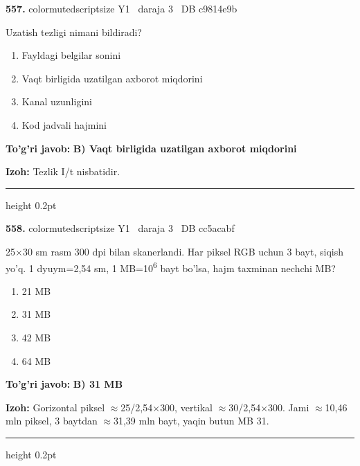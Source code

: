 \documentclass[10pt,a4paper,oneside]{article}
\begin{document}
\noindent\textbf{\color{ink}557.}  {color{muted}scriptsize Y1 \textbullet\ daraja 3 \textbullet\ DB c9814e9b}
\par
Uzatish tezligi nimani bildiradi?
\begin{enumerate}[label=\Alph*),leftmargin=9mm]
\item Fayldagi belgilar sonini
\item Vaqt birligida uzatilgan axborot miqdorini
\item Kanal uzunligini
\item Kod jadvali hajmini
\end{enumerate}
\begin{tcolorbox}[enhanced,breakable,colback=teal!4,colframe=teal!50!black,boxrule=0.5pt,arc=1.1mm,left=3mm,right=3mm,top=1.7mm,bottom=1.7mm,before skip=2mm,after skip=2mm]
\textbf{\color{teal}To'g'ri javob:} \textbf{B) Vaqt birligida uzatilgan axborot miqdorini}
\par\smallskip
\textbf{Izoh:} Tezlik I/t nisbatidir.
\end{tcolorbox}
\vspace{2mm}\hrule height 0.2pt \vspace{3mm}

\noindent\textbf{\color{ink}558.}  {color{muted}scriptsize Y1 \textbullet\ daraja 3 \textbullet\ DB cc5acabf}
\par
25\ensuremath{\times}30 sm rasm 300 dpi bilan skanerlandi. Har piksel RGB uchun 3 bayt, siqish yo'q. 1 dyuym=2,54 sm, 1 MB=10\textsuperscript{6} bayt bo'lsa, hajm taxminan nechchi MB?
\begin{enumerate}[label=\Alph*),leftmargin=9mm]
\item 21 MB
\item 31 MB
\item 42 MB
\item 64 MB
\end{enumerate}
\begin{tcolorbox}[enhanced,breakable,colback=teal!4,colframe=teal!50!black,boxrule=0.5pt,arc=1.1mm,left=3mm,right=3mm,top=1.7mm,bottom=1.7mm,before skip=2mm,after skip=2mm]
\textbf{\color{teal}To'g'ri javob:} \textbf{B) 31 MB}
\par\smallskip
\textbf{Izoh:} Gorizontal piksel \ensuremath{\approx}25/2,54\ensuremath{\times}300, vertikal \ensuremath{\approx}30/2,54\ensuremath{\times}300. Jami \ensuremath{\approx}10,46 mln piksel, 3 baytdan \ensuremath{\approx}31,39 mln bayt, yaqin butun MB 31.
\end{tcolorbox}
\vspace{2mm}\hrule height 0.2pt \vspace{3mm}
\end{document}
